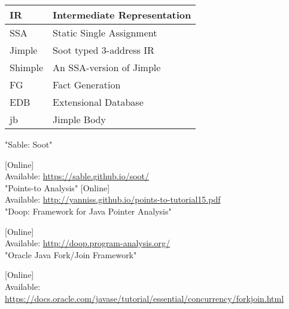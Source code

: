 \documentclass{dithesis}
\begin{document}
\begin{thesisabbreviations}
	\begin{tabularx}{\textwidth}{|X|X|}
        \hline
        IR & Intermediate Representation \\
        \hline
        SSA & Static Single Assignment \\
        \hline
        Jimple & Soot typed 3-address IR \\
        \hline
        Shimple & An SSA-version of Jimple \\
        \hline
        FG & Fact Generation \\
        \hline
        EDB & Extensional Database \\
        \hline
        jb & Jimple Body \\
		\hline
	\end{tabularx}
\end{thesisabbreviations}


\begin{thesisbibliography}[References]{99}
        "Sable: Soot"

        [Online] \\ Available: \url{https://sable.github.io/soot/} \\
        "Points-to Analysis"
        [Online] \\ Available: \url{http://yanniss.github.io/points-to-tutorial15.pdf} \\
        "Doop: Framework for Java Pointer Analysis"

        [Online] \\ Available: \url{http://doop.program-analysis.org/} \\
        "Oracle Java Fork/Join Framework"

        [Online] \\ Available: \url{https://docs.oracle.com/javase/tutorial/essential/concurrency/forkjoin.html} \\
\end{thesisbibliography}
\end{document}
